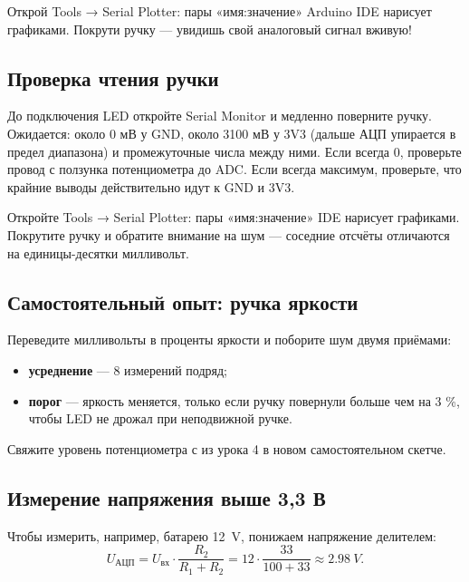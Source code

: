 
\begin{tip}
Открой \textsf{Tools → Serial Plotter}: пары «имя:значение» Arduino IDE нарисует графиками. Покрути ручку ---
увидишь свой аналоговый сигнал вживую!
\end{tip}

\subsection{Проверка чтения ручки}

До подключения LED откройте Serial Monitor и медленно поверните ручку. Ожидается: около 0 мВ у GND,
около 3100 мВ у 3V3 (дальше АЦП упирается в предел диапазона) и промежуточные числа между ними. Если всегда 0, проверьте провод с ползунка
потенциометра до ADC. Если всегда максимум, проверьте, что крайние выводы действительно идут к GND и 3V3.

\begin{tip}
Откройте \textsf{Tools → Serial Plotter}: пары «имя:значение» IDE нарисует графиками. Покрутите
ручку и обратите внимание на шум --- соседние отсчёты отличаются на единицы-десятки милливольт.
\end{tip}

\subsection{Самостоятельный опыт: ручка яркости}

Переведите милливольты в проценты яркости и поборите шум двумя приёмами:
\begin{itemize}
  \item \textbf{усреднение} --- 8 измерений подряд;
  \item \textbf{порог} --- яркость меняется, только если ручку повернули больше чем на 3 \%,
        чтобы LED не дрожал при неподвижной ручке.
\end{itemize}

Свяжите уровень потенциометра с  из урока 4 в новом самостоятельном скетче.

\subsection{Измерение напряжения выше 3,3 В}

Чтобы измерить, например, батарею \SI{12}{V}, понижаем напряжение делителем:
\[
  U_\text{АЦП} = U_\text{вх}\cdot\frac{R_2}{R_1+R_2}
  = 12 \cdot \frac{33}{100+33} \approx \SI{2.98}{V}.
\]

